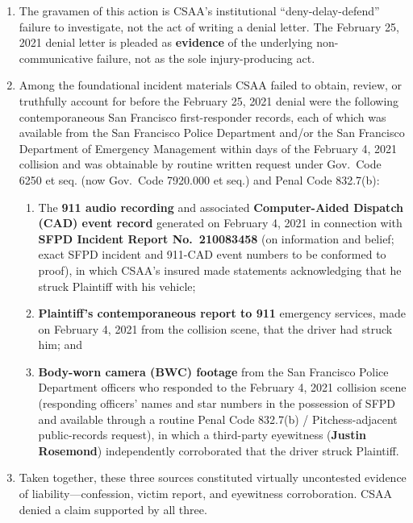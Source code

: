 \begin{enumerate}
\def\labelenumi{\arabic{enumi}.}
\setcounter{enumi}{6}
\item
  The gravamen of this action is CSAA's institutional ``deny-delay-defend'' failure to investigate, not the act of writing a denial letter. The February 25, 2021 denial letter is pleaded as \textbf{evidence} of the underlying non-communicative failure, not as the sole injury-producing act.
\item
  Among the foundational incident materials CSAA failed to obtain, review, or truthfully account for before the February 25, 2021 denial were the following contemporaneous San Francisco first-responder records, each of which was available from the San Francisco Police Department and/or the San Francisco Department of Emergency Management within days of the February 4, 2021 collision and was obtainable by routine written request under Gov.~Code \textsection{} 6250 et seq. (now Gov.~Code \textsection{}\textsection{} 7920.000 et seq.) and Penal Code \textsection{} 832.7(b):

  \begin{enumerate}
  \def\labelenumii{(\alph{enumii})}
  \item
    The \textbf{911 audio recording} and associated \textbf{Computer-Aided Dispatch (CAD) event record} generated on February 4, 2021 in connection with \textbf{SFPD Incident Report No.~210083458} (on information and belief; exact SFPD incident and 911-CAD event numbers to be conformed to proof), in which CSAA's insured made statements acknowledging that he struck Plaintiff with his vehicle;
  \item
    \textbf{Plaintiff's contemporaneous report to 911} emergency services, made on February 4, 2021 from the collision scene, that the driver had struck him; and
  \item
    \textbf{Body-worn camera (BWC) footage} from the San Francisco Police Department officers who responded to the February 4, 2021 collision scene (responding officers' names and star numbers in the possession of SFPD and available through a routine Penal Code \textsection{} 832.7(b) / Pitchess-adjacent public-records request), in which a third-party eyewitness (\textbf{Justin Rosemond}) independently corroborated that the driver struck Plaintiff.
  \end{enumerate}
\item
  Taken together, these three sources constituted virtually uncontested evidence of liability---confession, victim report, and eyewitness corroboration. CSAA denied a claim supported by all three.
\end{enumerate}

